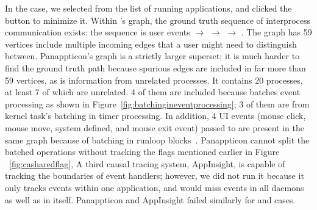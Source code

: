 In the  case, we selected  from the list of running
applications, and clicked the  button to minimize it. Within \xxx's
graph, the ground truth sequence of interprocess communication exists: the
sequence is  user events $\rightarrow$ 
$\rightarrow$  $\rightarrow$ . The graph
has 59 vertices include multiple incoming edges that a user might need to
distinguish between. Panappticon's graph is a strictly larger superset; it is
much harder to find the ground truth path because spurious edges are included
in far more than 59 vertices, as is information from unrelated processes.
It contains 20 processes, at least 7 of which are unrelated. 4 of them are
included because  batches event processing as shown in
Figure~\ref{fig:batchingineventprocessing}; 3 of them are from kernel task's
batching in timer processing. In addition, 4 UI events (mouse click, mouse move,
system defined, and mouse exit event) passed to  are present in the
same graph because of batching in runloop blocks~\cite{runloop}. Panappticon
cannot split the batched operations without tracking the flags mentioned earlier
in Figure ~\ref{fig:casharedflag}, A third causal tracing system, AppInsight, is
capable of tracking the boundaries of event handlers; however, we did not run it
because it only tracks events within one application, and would miss events in
all daemons as well as in  itself.  Panappticon and
AppInsight failed similarly for  and  cases.






